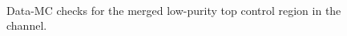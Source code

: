 \begin{figure}[ht]
     \\
    \caption{Data-MC checks for the merged low-purity top control region in the \olep channel.}
    \label{fig:CRTopMerLPPlots1Lep2}
\end{figure}

